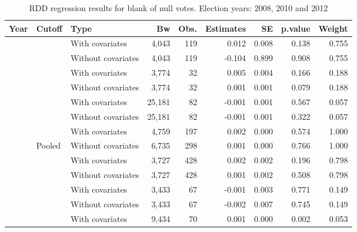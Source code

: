 \documentclass[
  12pt,
]{article}
\begin{document}
\begin{table}[H]

\caption{\label{tab:r.pct.bn.dif}RDD regression results for blank of null votes. Election years: 2008, 2010 and 2012}
\centering
\begin{tabular}[t]{lllrrrrrr}
\toprule
Year & Cutoff & Type & Bw & Obs. & Estimates & SE & p.value & Weight\\
\midrule
 &  & With covariates & 4,043 & 119 & 0.012 & 0.008 & 0.138 & 0.755\\


 & \multirow{-2}{*}{\raggedright\arraybackslash 20000} & Without covariates & 4,043 & 119 & -0.104 & 0.899 & 0.908 & 0.755\\


 &  & With covariates & 3,774 & 32 & 0.005 & 0.004 & 0.166 & 0.188\\


 & \multirow{-2}{*}{\raggedright\arraybackslash 40000} & Without covariates & 3,774 & 32 & 0.001 & 0.001 & 0.079 & 0.188\\


 &  & With covariates & 25,181 & 82 & -0.001 & 0.001 & 0.567 & 0.057\\


 & \multirow{-2}{*}{\raggedright\arraybackslash 60000} & Without covariates & 25,181 & 82 & -0.001 & 0.001 & 0.322 & 0.057\\


 &  & With covariates & 4,759 & 197 & 0.002 & 0.000 & 0.574 & 1.000\\


\multirow{-8}{*}{\raggedright\arraybackslash 2008} & Pooled & Without covariates & 6,735 & 298 & 0.001 & 0.000 & 0.766 & 1.000\\
\cmidrule{1-9}
 &  & With covariates & 3,727 & 428 & 0.002 & 0.002 & 0.196 & 0.798\\


 & \multirow{-2}{*}{\raggedright\arraybackslash 20000} & Without covariates & 3,727 & 428 & 0.001 & 0.002 & 0.508 & 0.798\\


 &  & With covariates & 3,433 & 67 & -0.001 & 0.003 & 0.771 & 0.149\\


 & \multirow{-2}{*}{\raggedright\arraybackslash 40000} & Without covariates & 3,433 & 67 & -0.002 & 0.007 & 0.745 & 0.149\\


 &  & With covariates & 9,434 & 70 & 0.001 & 0.000 & 0.002 & 0.053\\



\end{tabular}
\end{table}
\end{document}
